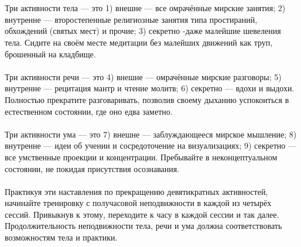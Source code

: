 \\ \\ Три активности тела — это 1) внешне — все омрачённые мирские занятия; 2) внутренне — второстепенные религиозные занятия типа простираний, обхождений (святых мест) и прочие; 3) секретно -даже малейшие шевеления тела. Сидите на своём месте медитации без малейших движений как труп, брошенный на кладбище.
\\ \\ Три активности речи — это 4) внешне — омрачённые мирские разговоры; 5) внутренне — рецитация мантр и чтение молитв; 6) секретно — вдохи и выдохи. Полностью прекратите разговаривать, позволив своему дыханию успокоиться в естественном состоянии, где оно едва заметно.
\\ \\ Три активности ума — это 7) внешне — заблуждающееся мирское мышление; 8) внутренне — идеи об учении и сосредоточение на визуализациях; 9) секретно — все умственные проекции и концентрации. Пребывайте в неконцептуальном состоянии, не покидая присутствия осознавания.
\\ \\ Практикуя эти наставления по прекращению девятикратных активностей, начинайте тренировку с получасовой неподвижности в каждой из четырёх сессий. Привыкнув к этому, переходите к часу в каждой сессии и так далее. Продолжительность неподвижности тела, речи и ума должна соответствовать возможностям тела и практики.
